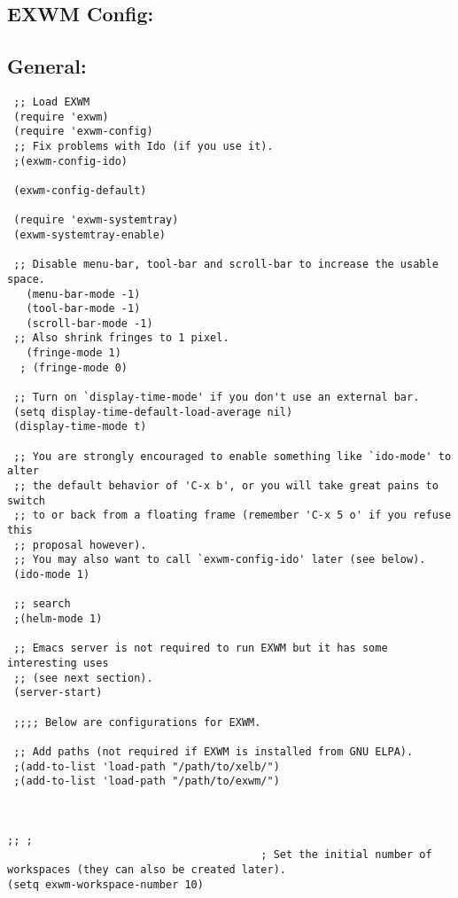 \documentclass[11pt]{article}
\begin{document}
\subsection{EXWM Config:}
\label{sec:org2c38f45}
\subsection{General:}
\label{sec:org841d9db}
\begin{verbatim}
 ;; Load EXWM
 (require 'exwm)
 (require 'exwm-config)
 ;; Fix problems with Ido (if you use it).
 ;(exwm-config-ido)

 (exwm-config-default)

 (require 'exwm-systemtray)
 (exwm-systemtray-enable)

 ;; Disable menu-bar, tool-bar and scroll-bar to increase the usable space.
   (menu-bar-mode -1)
   (tool-bar-mode -1)
   (scroll-bar-mode -1)
 ;; Also shrink fringes to 1 pixel.
   (fringe-mode 1)
  ; (fringe-mode 0)

 ;; Turn on `display-time-mode' if you don't use an external bar.
 (setq display-time-default-load-average nil)
 (display-time-mode t)

 ;; You are strongly encouraged to enable something like `ido-mode' to alter
 ;; the default behavior of 'C-x b', or you will take great pains to switch
 ;; to or back from a floating frame (remember 'C-x 5 o' if you refuse this
 ;; proposal however).
 ;; You may also want to call `exwm-config-ido' later (see below).
 (ido-mode 1)

 ;; search
 ;(helm-mode 1)

 ;; Emacs server is not required to run EXWM but it has some interesting uses
 ;; (see next section).
 (server-start)

 ;;;; Below are configurations for EXWM.

 ;; Add paths (not required if EXWM is installed from GNU ELPA).
 ;(add-to-list 'load-path "/path/to/xelb/")
 ;(add-to-list 'load-path "/path/to/exwm/")



;; ;
                                        ; Set the initial number of workspaces (they can also be created later).
(setq exwm-workspace-number 10)


\end{verbatim}
\end{document}
